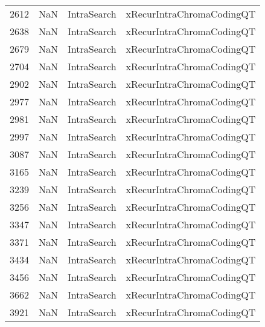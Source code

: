 \begin{tabular}{llll}
2612 &                   NaN &                IntraSearch &                 xRecurIntraChromaCodingQT \\
2638 &                   NaN &                IntraSearch &                 xRecurIntraChromaCodingQT \\
2679 &                   NaN &                IntraSearch &                 xRecurIntraChromaCodingQT \\
2704 &                   NaN &                IntraSearch &                 xRecurIntraChromaCodingQT \\
2902 &                   NaN &                IntraSearch &                 xRecurIntraChromaCodingQT \\
2977 &                   NaN &                IntraSearch &                 xRecurIntraChromaCodingQT \\
2981 &                   NaN &                IntraSearch &                 xRecurIntraChromaCodingQT \\
2997 &                   NaN &                IntraSearch &                 xRecurIntraChromaCodingQT \\
3087 &                   NaN &                IntraSearch &                 xRecurIntraChromaCodingQT \\
3165 &                   NaN &                IntraSearch &                 xRecurIntraChromaCodingQT \\
3239 &                   NaN &                IntraSearch &                 xRecurIntraChromaCodingQT \\
3256 &                   NaN &                IntraSearch &                 xRecurIntraChromaCodingQT \\
3347 &                   NaN &                IntraSearch &                 xRecurIntraChromaCodingQT \\
3371 &                   NaN &                IntraSearch &                 xRecurIntraChromaCodingQT \\
3434 &                   NaN &                IntraSearch &                 xRecurIntraChromaCodingQT \\
3456 &                   NaN &                IntraSearch &                 xRecurIntraChromaCodingQT \\
3662 &                   NaN &                IntraSearch &                 xRecurIntraChromaCodingQT \\
3921 &                   NaN &                IntraSearch &                 xRecurIntraChromaCodingQT \\

\end{tabular}
